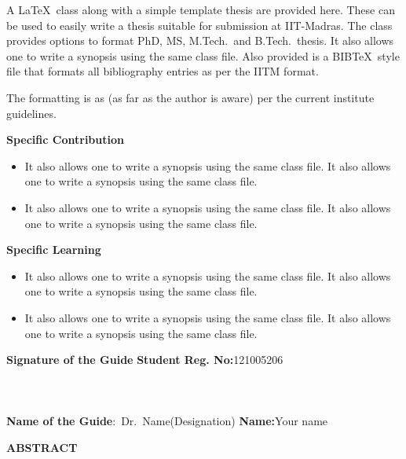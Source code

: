 \documentclass[a4paper, 12pt, oneside]{sastra}
\begin{document}
	\noindent A \LaTeX\ class along with a simple template thesis are provided here.  These can be used to easily write a thesis suitable for submission at IIT-Madras.  The class provides options to format PhD, MS, M.Tech.\ and B.Tech.\ thesis.  It also allows one to write a synopsis using the same class file.  Also provided is a BIB\TeX\ style file that formats all bibliography entries as per the IITM format.
	
	The formatting is as (as far as the author is aware) per the current institute guidelines.
	
	\noindent \textbf{Specific Contribution}
	\begin{itemize}
		\item It also allows one to write a synopsis using the same class file. It also allows one to write a synopsis using the same class file.
		\item It also allows one to write a synopsis using the same class file. It also allows one to write a synopsis using the same class file.
	\end{itemize}
	\noindent \textbf{Specific Learning}
	\begin{itemize}
		\item It also allows one to write a synopsis using the same class file. It also allows one to write a synopsis using the same class file.
		\item It also allows one to write a synopsis using the same class file. It also allows one to write a synopsis using the same class file.
	\end{itemize}
	
	\vspace*{24pt}
	
	\noindent \textbf{Signature of the Guide} \hspace*{66mm} \textbf{Student Reg. No:}121005206\\
		\\
	\\
	\\
	\noindent \textbf{Name of the Guide}:~Dr.~Name(Designation) \hspace*{31mm} \textbf{Name:}Your name
	\pagebreak
	
	\begin{center}
		\Large{{\textbf{ABSTRACT}}}
	\end{center}
	
	
\end{document}
